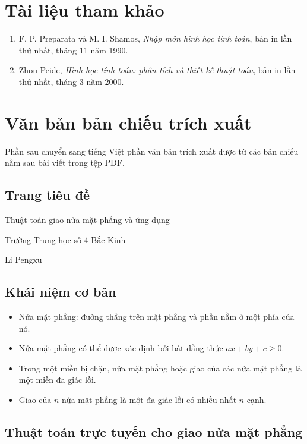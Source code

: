 \documentclass[11pt]{article}
\begin{document}
\section{Tài liệu tham khảo}

\begin{enumerate}
  \item F. P. Preparata và M. I. Shamos, \textit{Nhập môn hình học tính toán},
  bản in lần thứ nhất, tháng 11 năm 1990.
  \item Zhou Peide, \textit{Hình học tính toán: phân tích và thiết kế thuật
  toán}, bản in lần thứ nhất, tháng 3 năm 2000.
\end{enumerate}

\appendix
\section{Văn bản bản chiếu trích xuất}

Phần sau chuyển sang tiếng Việt phần văn bản trích xuất được từ các bản
chiếu nằm sau bài viết trong tệp PDF.

\subsection*{Trang tiêu đề}

\begin{center}
\Large Thuật toán giao nửa mặt phẳng và ứng dụng

\normalsize Trường Trung học số 4 Bắc Kinh

Li Pengxu
\end{center}

\subsection*{Khái niệm cơ bản}

\begin{itemize}
  \item Nửa mặt phẳng: đường thẳng trên mặt phẳng và phần nằm ở một phía của
  nó.
  \item Nửa mặt phẳng có thể được xác định bởi bất đẳng thức
  \(ax+by+c\ge 0\).
  \item Trong một miền bị chặn, nửa mặt phẳng hoặc giao của các nửa mặt phẳng
  là một miền đa giác lồi.
  \item Giao của \(n\) nửa mặt phẳng là một đa giác lồi có nhiều nhất \(n\)
  cạnh.
\end{itemize}

\subsection*{Thuật toán trực tuyến cho giao nửa mặt phẳng}
\end{document}
